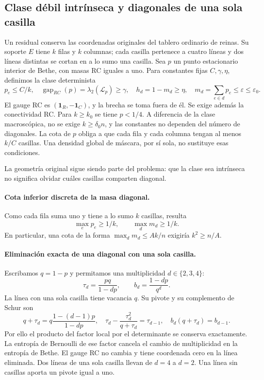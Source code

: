 \subsection{Clase débil intrínseca y diagonales de una sola casilla}\label{sec:B5T01}
Un residual conserva las coordenadas originales del tablero ordinario de reinas.
Su soporte $E$ tiene $k$ filas y $k$ columnas; cada casilla pertenece a
cuatro líneas y dos líneas distintas se cortan en a lo sumo una casilla.
Sea $p$ un punto estacionario interior de Bethe, con masas RC iguales a uno.
Para constantes fijas $C,\gamma,\eta$, definimos la clase determinista
\[
 p_e\le C/k,\quad \operatorname{gap}_{RC}(p)=\lambda_2(\mathscr L_p)\ge\gamma,
 \quad h_d=1-m_d\ge\eta,\quad
 m_d=\sum_{e\in d}p_e\le\varepsilon\le\varepsilon_0.
\]
El gauge RC es $(\mathbf1_R,-\mathbf1_C)$, y la brecha se toma fuera de él. Se exige además la
conectividad RC. Para $k\ge k_0$ se tiene $p<1/4$. A diferencia de la clase macroscópica, no se
exige $k\ge\delta_0n$, y las constantes no dependen del número de diagonales. La cota de $p$ obliga
a que cada fila y cada columna tengan al menos $k/C$ casillas. Una densidad global de máscara,
por sí sola, no sustituye esas condiciones.

La geometría original sigue siendo parte del problema: que la clase sea intrínseca no significa
olvidar cuáles casillas comparten diagonal.

\paragraph{Cota inferior discreta de la masa diagonal.}
Como cada fila suma uno y tiene a lo sumo $k$ casillas, resulta
\[
 \max_e p_e\ge1/k,\qquad \max_d m_d\ge1/k.
\]
En particular, una cota de la forma $\max_dm_d\le Ak/n$ exigiría $k^2\ge n/A$.

\paragraph{Eliminación exacta de una diagonal con una sola casilla.}
Escribamos $q=1-p$ y permitamos una multiplicidad $d\in\{2,3,4\}$:
\[
 \tau_d=\frac{pq}{1-dp},\qquad b_d=\frac{1-dp}{q^d}.
\]
La línea con una sola casilla tiene vacancia $q$. Su pivote y su complemento de Schur son
\[
 q+\tau_d=q\frac{1-(d-1)p}{1-dp},\quad
 \tau_d-\frac{\tau_d^2}{q+\tau_d}=\tau_{d-1},\quad
 b_d(q+\tau_d)=b_{d-1}.
\]
Por ello el producto del factor local por el determinante se conserva exactamente.
La entropía de Bernoulli de ese factor cancela el cambio de multiplicidad
en la entropía de Bethe. El gauge RC no cambia y tiene coordenada cero
en la línea eliminada. Dos líneas de una sola casilla llevan de $d=4$ a $d=2$.
Una línea sin casillas aporta un pivote igual a uno.

